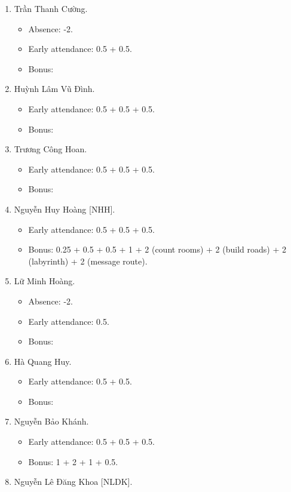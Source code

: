 \documentclass{article}
\begin{document}
\begin{enumerate}
	\item {\sc Trần Thanh Cường.}
	\begin{itemize}
		\item Absence: -2.
		\item Early attendance: 0.5 + 0.5.
		\item Bonus: 
	\end{itemize}
	\item {\sc Huỳnh Lâm Vũ Đình.}
	\begin{itemize}
		\item Early attendance: 0.5 + 0.5 + 0.5.
		\item Bonus: 
	\end{itemize}
	\item {\sc Trương Công Hoan.}
	\begin{itemize}
		\item Early attendance: 0.5 + 0.5 + 0.5.
		\item Bonus: 
	\end{itemize}
	\item {\sc Nguyễn Huy Hoàng [NHH].}
	\begin{itemize}
		\item Early attendance: 0.5 + 0.5 + 0.5.
		\item Bonus: 0.25 + 0.5 + 0.5 + 1 + 2 (count rooms) + 2 (build roads) + 2 (labyrinth) + 2 (message route).
	\end{itemize}
	\item {\sc Lữ Minh Hoàng.}
	\begin{itemize}
		\item Absence: -2.
		\item Early attendance: 0.5.
		\item Bonus: 
	\end{itemize}
	\item {\sc Hà Quang Huy.}
	\begin{itemize}
		\item Early attendance: 0.5 + 0.5.
		\item Bonus: 
	\end{itemize}
	\item {\sc Nguyễn Bảo Khánh.}
	\begin{itemize}
		\item Early attendance: 0.5 + 0.5 + 0.5.
		\item Bonus: 1 + 2 + 1 + 0.5.
	\end{itemize}
	\item {\sc Nguyễn Lê Đăng Khoa [NLDK].}

\end{enumerate}
\end{document}

